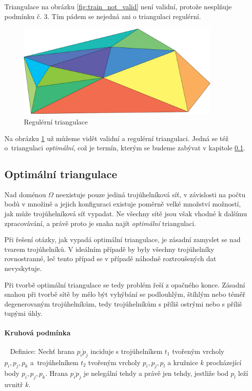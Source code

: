 \documentclass[12pt,a4paper]{article}
\begin{document}
\newpage

Triangulace na obrázku \ref{fig:train_not_valid} není validní, protože
nesplňuje podmínku č. 3. Tím pádem se nejedná ani o triangulaci
regulérní.

\begin{figure}[h!]
\centering
\includegraphics[width=0.9\textwidth]{img/triangulation.png}
\caption{Regulérní triangulace}
\label{fig:triangulace}
\end{figure}

Na obrázku \ref{fig:triangulace} už můžeme vidět validní a regulérní
triangulaci. Jedná se též o~triangulaci \emph{optimální}, což je
termín, kterým se budeme zabývat v kapitole \ref{subsec:Optim_trian}.

\newpage
\subsection{Optimální triangulace}
\label{subsec:Optim_trian}

Nad doménou $\Omega$ neexistuje pouze jediná trojúhelníková síť, v
závislosti na počtu bodů v množině a jejich konfiguraci existuje
poměrně velké množství možností, jak může trojúhelníková síť
vypadat. Ne všechny sítě jsou však vhodné k dalšímu zpracovávání, a
právě proto je snaha najít \emph{optimální} triangulaci.

Při řešení otázky, jak vypadá optimální triangulace, je zásadní
zamyslet se nad tvarem trojúhelníků. V ideálním případě by byly
všechny trojúhelníky rovnostranné, leč tento případ se v případě
náhodně roztroušených dat nevyskytuje.

Při tvorbě optimální triangulace se tedy problém řeší z opačného
konce. Zásadní snahou při tvorbě sítě by mělo být vyhýbání se
podlouhlým, štíhlým nebo téměř degenerovaným trojúhelníkům, tedy
trojúhelníkům s příliš ostrými nebo s příliš tupými úhly.

\paragraph{Kruhová podmínka}
~\newline
Definice: Nechť hrana $\overline{p_ip_j}$ inciduje s trojúhelníkem
$t_1$ tvořeným vrcholy $p_i,p_j,p_k$ a~trojúhelníkem $t_2$ tvořeným
vrcholy $p_i,p_j,p_l$ a kružnice $k$ procházející body
$p_i,p_j,p_k$. Hrana $\overline{p_ip_j}$ je nelegální tehdy a právě
jen tehdy, jestliže bod $p_l$ leží uvnitř $k$.
\end{document}
